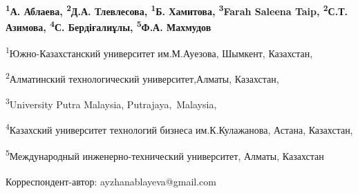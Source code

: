 
\begin{articleheader}

{\bfseries
\textsuperscript{1}А. Аблаева\textsuperscript{\envelope },
\textsuperscript{2}Д.А. Тлевлесова,
\textsuperscript{1}Б. Хамитова,
\textsuperscript{3}Farah Saleena Taip,
\textsuperscript{2}С.Т. Азимова,
\textsuperscript{4}С. Бердіғалиұлы,
\textsuperscript{5}Ф.А. Махмудов
}
\end{articleheader}

\begin{affiliation}
\textsuperscript{1}Южно-Казахстанский университет им.М.Ауезова, Шымкент, Казахстан,

\textsuperscript{2}Алматинский технологический университет,Алматы, Казахстан,

\textsuperscript{3}University Putra Malaysia, Putrajaya,~Malaysia,

\textsuperscript{4}Казахский университет технологий бизнеса им.К.Кулажанова, Астана, Казахстан,

\textsuperscript{5}Международный инженерно-технический университет, Алматы, Казахстан

\raggedright \textsuperscript{\envelope }Корреспондент-автор: ayzhanablayeva@gmail.com
\end{affiliation}

